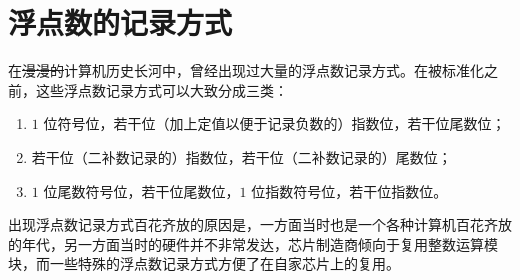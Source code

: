 \section{浮点数的记录方式}\label{sec:NumberSystemBasics/FloatingPointNotations}
    在\sout{漫漫的}计算机历史长河中，曾经出现过大量的浮点数记录方式。在被标准化之前，这些浮点数记录方式可以大致分成三类\cite{jjgsavard-2005-cp0201}：
    \begin{enumerate}
        \item $1$ 位符号位，若干位（加上定值以便于记录负数的）指数位，若干位尾数位；
        \item 若干位（二补数记录的）指数位，若干位（二补数记录的）尾数位；
        \item $1$ 位尾数符号位，若干位尾数位，$1$ 位指数符号位，若干位指数位。
    \end{enumerate}
    出现浮点数记录方式百花齐放的原因是，一方面当时也是一个各种计算机百花齐放的年代，另一方面当时的硬件并不非常发达，芯片制造商倾向于复用整数运算模块，而一些特殊的浮点数记录方式方便了在自家芯片上的复用。
